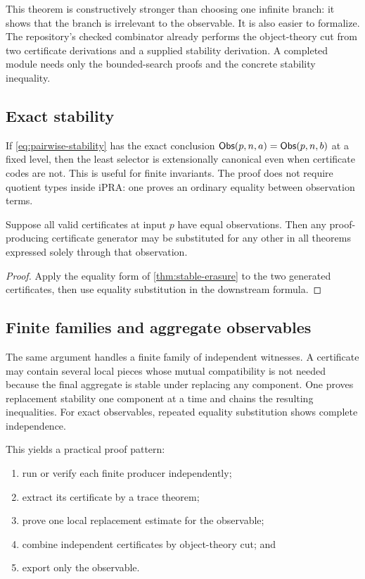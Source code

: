 This theorem is constructively stronger than choosing one infinite branch: it
shows that the branch is irrelevant to the observable.  It is also easier to
formalize.  The repository's checked combinator
 already performs the object-theory
cut from two certificate derivations and a supplied stability derivation.  A
completed module needs only the bounded-search proofs and the concrete
stability inequality.

\subsection{Exact stability}

If \eqref{eq:pairwise-stability} has the exact conclusion
\(\mathsf{Obs}(p,n,a)=\mathsf{Obs}(p,n,b)\) at a fixed level, then the least selector is
extensionally canonical even when certificate codes are not.  This is useful
for finite invariants.  The proof does not require quotient types inside iPRA:
one proves an ordinary equality between observation terms.

\begin{corollary}
Suppose all valid certificates at input \(p\) have equal observations.  Then
any proof-producing certificate generator may be substituted for any other in
all theorems expressed solely through that observation.
\end{corollary}

\begin{proof}
Apply the equality form of \cref{thm:stable-erasure} to the two generated
certificates, then use equality substitution in the downstream formula.
\end{proof}

\subsection{Finite families and aggregate observables}

The same argument handles a finite family of independent witnesses.  A
certificate may contain several local pieces whose mutual compatibility is not
needed because the final aggregate is stable under replacing any component.
One proves replacement stability one component at a time and chains the
resulting inequalities.  For exact observables, repeated equality substitution
shows complete independence.

This yields a practical proof pattern:
\begin{enumerate}[label=(\arabic*)]
\item run or verify each finite producer independently;
\item extract its certificate by a trace theorem;
\item prove one local replacement estimate for the observable;
\item combine independent certificates by object-theory cut; and
\item export only the observable.
\end{enumerate}


